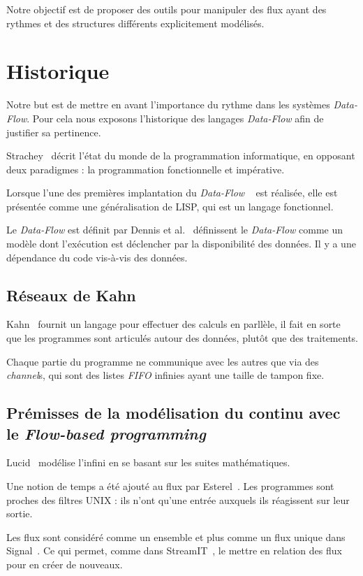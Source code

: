 \documentclass{llncs}
\newcommand{\DF}{\emph{Data-Flow} }
\newcommand{\DFp}{\emph{Data-Flow}. }
\newcommand{\FB}{\emph{Flow-based programming} }
\begin{document}
Notre objectif est de proposer des outils pour manipuler des flux ayant des
rythmes et des structures différents explicitement modélisés.

\section{Historique}
Notre but est de mettre en avant l'importance du rythme dans les systèmes \DFp
Pour cela nous exposons l'historique des langages \DF afin de justifier sa
pertinence.

Strachey~\cite{Strachey73} décrit l'état du monde de la programmation
informatique, en opposant deux paradigmes : la programmation fonctionnelle et impérative.

Lorsque l'une des premières implantation du \DF~\cite{Dennis72} est réalisée, elle
est présentée comme une généralisation de LISP, qui est un langage fonctionnel.

Le \DF est définit par Dennis et al.~\cite{Dennis72} définissent le \DF comme un modèle dont l'exécution
est déclencher par la disponibilité des données.
Il y a une dépendance du code vis-à-vis des données.

\subsection{Réseaux de Kahn}
Kahn~\cite{Kahn74} fournit un langage pour effectuer des calculs en parllèle,
il fait en sorte que les programmes sont articulés autour des données, plutôt que
des traitements.

Chaque partie du programme ne communique avec les autres que via des
\emph{channel}s, qui sont des listes \emph{FIFO} infinies ayant une taille de
tampon fixe.

\subsection{Prémisses de la modélisation du continu avec le \FB}
Lucid~\cite{AshcroftW76} modélise l'infini en se basant sur les suites mathématiques.

Une notion de temps a été ajouté au flux par Esterel~\cite{Berry84}.
Les programmes sont proches des filtres UNIX : ils n'ont qu'une entrée auxquels
ils réagissent sur leur sortie.

Les flux sont considéré comme un ensemble et plus comme un flux unique dans Signal~\cite{Benveniste85}.
Ce qui permet, comme dans StreamIT~\cite{Thies02}, le mettre en relation des flux
pour en créer de nouveaux.
\end{document}
